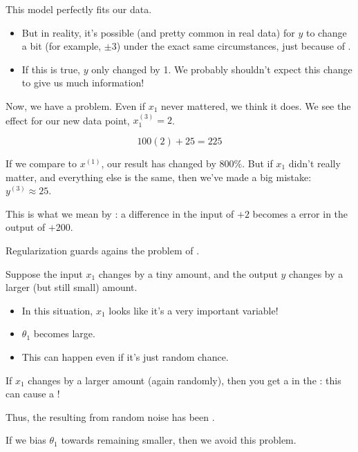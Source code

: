         This model perfectly fits our data.

        \begin{itemize}
            \item But in reality, it's possible (and pretty common in real data) for $y$ to change a bit (for example, $\pm 3$) under the exact same circumstances, just because of . 
            \item If this is true, $y$ only changed by 1. We probably shouldn't expect this change to give us much information!
        \end{itemize}

        Now, we have a problem. Even if $x_1$ never mattered, we think it does. We see the effect for our new data point, $x_1^{(3)}=2$.

        \begin{equation}
            100(2) + 25 = 225
        \end{equation}

        If we compare to $x^{(1)}$, our result has changed by 800\%. But if $x_1$ didn't really matter, and everything else is the same, then we've made a big mistake: $y^{(3)} \approx 25$.

        This is what we mean by : a  difference in the input of $+2$ becomes a  error in the output of $+200$.\\

        \begin{concept}
            Regularization guards agains the problem of .

            Suppose the input $x_1$ changes by a tiny amount, and the output $y$ changes by a larger (but still small) amount.

            \begin{itemize}
                \item In this situation, $x_1$ looks like it's a very important variable!
                \item $\theta_1$ becomes large.
                \item This can happen even if it's just random chance.
            \end{itemize}

            If $x_1$ changes by a larger amount (again randomly), then you get a  in the : this can cause a !

            Thus, the  resulting from random noise has been .

            If we bias $\theta_1$ towards remaining smaller, then we avoid this problem.
        \end{concept}

